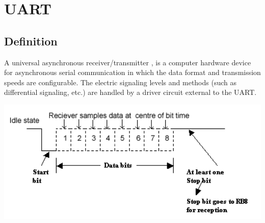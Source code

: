 \section{UART}

\subsection{Definition}
A universal asynchronous receiver/transmitter , is a computer hardware device for asynchronous serial communication in which the data format and transmission speeds are configurable. The electric signaling levels and methods (such as differential signaling, etc.) are handled by a driver circuit external to the UART.\\

\centerline{
	\centering
	\includegraphics[width=1.0\textwidth]{overview/images/uart.png}
}
